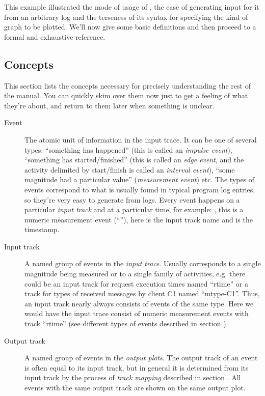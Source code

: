 \documentclass{article}
\begin{document}
This example illustrated the mode of usage of \timeplot{}, the ease of generating input for it from an arbitrary log and the terseness of its syntax for specifying the kind of graph to be plotted. We'll now give some basic definitions and then proceed to a formal and exhaustive reference.

\subsection{Concepts}
\label{sec:tplot-concepts}

This section lists the concepts necessary for precisely understanding the rest of the manual. You can quickly skim over them now just to get a feeling of what they're about, and return to them later when something is unclear.

\begin{description}
\item[Event] The atomic unit of information in the input trace. It can be one of several types: ``something has happened'' (this is called an \emph{impulse event}), ``something has started/finished'' (this is called an \emph{edge event}, and the activity delimited by start/finish is called an \emph{interval event}), ``some magnitude had a particular value'' (\emph{measurement event}) etc. The types of events correspond to what is usually found in typical program log entries, so they're very easy to generate from logs. Every event happens on a particular \emph{input track} and at a particular time, for example: , this is a numeric measurement event (``\hlverb{=}''), here  is the input track name and  is the timestamp.
\item[Input track] A named group of events in the \emph{input trace}. Usually corresponds to a single magnitude being measured or to a single family of activities, e.g. there could be an input track for request execution times named ``rtime'' or a track for types of received messages by client C1 named ``mtype-C1''. Thus, an input track nearly always consists of events of the same type. Here we would have the input trace consist of numeric measurement events with track ``rtime'' (see different types of events described in section ).
\item[Output track] A named group of events in the \emph{output plots}. The output track of an event is often equal to its input track, but in general it is determined from its input track by the process of \emph{track mapping} described in section . All events with the same output track are shown on the same output plot.

\end{description}
\end{document}
